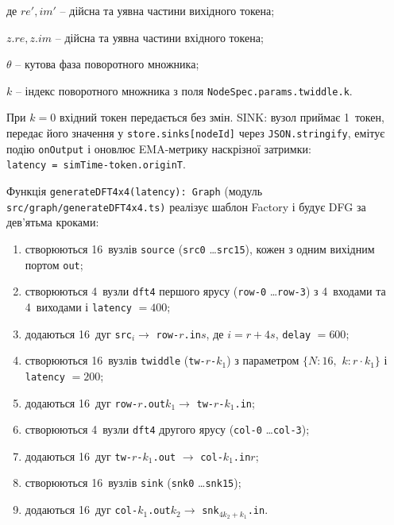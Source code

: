 \documentclass[
]{article}
\begin{document}
де \({re}',{im}'\) -- дійсна та уявна частини вихідного токена;

\(z.re,z.im\) -- дійсна та уявна частини вхідного токена;

\(\theta\) -- кутова фаза поворотного множника;

\(k\) -- індекс поворотного множника з поля \texttt{NodeSpec.params.twiddle.k}.

При \(k = 0\) вхідний токен передається без змін. SINK: вузол приймає
1~токен, передає його значення у
\texttt{store.sinks}\texttt{{[}}\texttt{nodeId}\texttt{{]}} через
\texttt{JSON.stringify}, емітує подію \texttt{onOutput} і оновлює
EMA-метрику наскрізної затримки:
\texttt{latency}\texttt{\ =\ }\texttt{simTime-token.originT}.

Функція
\texttt{generateDFT4x4(}\texttt{latency}\texttt{):\ }\texttt{Graph}
(модуль
\texttt{src}\texttt{/}\texttt{graph}\texttt{/generateDFT4x4.ts}\texttt{)}
реалізує шаблон Factory і будує DFG за дев'ятьма кроками:

\begin{enumerate}
\def\labelenumi{\arabic{enumi}.}
\item
  створюються 16~вузлів \texttt{source} (\texttt{src0}
  \ldots{}\texttt{src15}), кожен з одним вихідним портом \texttt{out};
\item
  створюються 4~вузли \texttt{dft4} першого ярусу (\texttt{row-0}
  \ldots{}\texttt{row-3}) з 4~входами та 4~виходами і \texttt{latency}
  \(= 400\);
\item
  додаються 16~дуг \texttt{src}\(_{i} \rightarrow\)
  \texttt{row}\texttt{-}\(r\)\texttt{.in}\(s\), де \(i = r + 4s\),
  \texttt{delay} \(= 600\);
\item
  створюються 16~вузлів \texttt{twiddle}
  (\texttt{tw}\texttt{-}\(r\)\texttt{-}\(k_{1}\)) з параметром
  \(\{ N:16,\mspace{6mu} k:r \cdot k_{1}\}\) і \texttt{latency}
  \(= 200\);
\item
  додаються 16~дуг
  \texttt{row}\texttt{-}\(r\)\texttt{.out}\(k_{1} \rightarrow\)
  \texttt{tw}\texttt{-}\(r\)\texttt{-}\(k_{1}\)\texttt{.in};
\item
  створюються 4~вузли \texttt{dft4} другого ярусу (\texttt{col-0}
  \ldots{}\texttt{col-3});
\item
  додаються 16~дуг
  \texttt{tw}\texttt{-}\(r\)\texttt{-}\(k_{1}\)\texttt{.out}
  \(\rightarrow\) \texttt{col}\texttt{-}\(k_{1}\)\texttt{.in}\(r\);
\item
  створюються 16~вузлів \texttt{sink} (\texttt{snk0}
  \ldots{}\texttt{snk15});
\item
  додаються 16~дуг
  \texttt{col}\texttt{-}\(k_{1}\)\texttt{.out}\(k_{2} \rightarrow\)
  \texttt{snk}\(_{4k_{2} + k_{1}}\)\texttt{.in}.
\end{enumerate}
\end{document}
